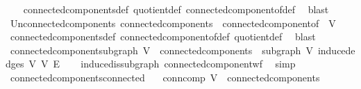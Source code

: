 \begin{isabellebody}
%
\isadelimproof
\ \ %
\endisadelimproof
%
\isatagproof
{}\isamarkupfalse%
\ connected{\isacharunderscore}{\kern0pt}components{\isacharunderscore}{\kern0pt}def\ quotient{\isacharunderscore}{\kern0pt}def\ connected{\isacharunderscore}{\kern0pt}component{\isacharunderscore}{\kern0pt}of{\isacharunderscore}{\kern0pt}def\ \isamarkupfalse%
\ blast%
\endisatagproof
{\isafoldproof}%
%
\isadelimproof
\isanewline
%
\endisadelimproof
\isanewline
{}\isamarkupfalse%
\ Un{\isacharunderscore}{\kern0pt}connected{\isacharunderscore}{\kern0pt}components{\isacharcolon}{\kern0pt}\ {\isachardoublequoteopen}connected{\isacharunderscore}{\kern0pt}components\ {\isacharequal}{\kern0pt}\ connected{\isacharunderscore}{\kern0pt}component{\isacharunderscore}{\kern0pt}of\ {\isacharbackquote}{\kern0pt}\ V{\isachardoublequoteclose}\isanewline
%
\isadelimproof
\ \ %
\endisadelimproof
%
\isatagproof
{}\isamarkupfalse%
\ connected{\isacharunderscore}{\kern0pt}components{\isacharunderscore}{\kern0pt}def\ connected{\isacharunderscore}{\kern0pt}component{\isacharunderscore}{\kern0pt}of{\isacharunderscore}{\kern0pt}def\ quotient{\isacharunderscore}{\kern0pt}def\ \isamarkupfalse%
\ blast%
\endisatagproof
{\isafoldproof}%
%
\isadelimproof
\isanewline
%
\endisadelimproof
\isanewline
{}\isamarkupfalse%
\ connected{\isacharunderscore}{\kern0pt}component{\isacharunderscore}{\kern0pt}subgraph{\isacharcolon}{\kern0pt}\ {\isachardoublequoteopen}V{\isacharprime}{\kern0pt}\ {\isasymin}\ connected{\isacharunderscore}{\kern0pt}components\ {\isasymLongrightarrow}\ subgraph\ V{\isacharprime}{\kern0pt}\ {\isacharparenleft}{\kern0pt}induced{\isacharunderscore}{\kern0pt}edges\ V{\isacharprime}{\kern0pt}{\isacharparenright}{\kern0pt}\ V\ E{\isachardoublequoteclose}\isanewline
%
\isadelimproof
\ \ %
\endisadelimproof
%
\isatagproof
{}\isamarkupfalse%
\ induced{\isacharunderscore}{\kern0pt}is{\isacharunderscore}{\kern0pt}subgraph\ connected{\isacharunderscore}{\kern0pt}component{\isacharunderscore}{\kern0pt}wf\ \isamarkupfalse%
\ simp%
\endisatagproof
{\isafoldproof}%
%
\isadelimproof
\isanewline
%
\endisadelimproof
\isanewline
{}\isamarkupfalse%
\ connected{\isacharunderscore}{\kern0pt}components{\isacharunderscore}{\kern0pt}connected{}{\isacharcolon}{\kern0pt}\isanewline
\ \ \ conn{\isacharunderscore}{\kern0pt}comp{\isacharcolon}{\kern0pt}\ {\isachardoublequoteopen}V{\isacharprime}{\kern0pt}\ {\isasymin}\ connected{\isacharunderscore}{\kern0pt}components{\isachardoublequoteclose}\isanewline

\end{isabellebody}
